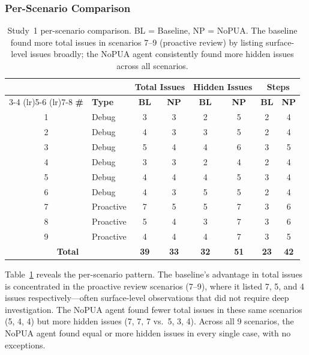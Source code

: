 \documentclass[11pt]{article}
\begin{document}
\subsubsection{Per-Scenario Comparison}

\begin{table}[t]
\centering
\small
\begin{tabular}{@{}clcccccc@{}}
\toprule
& & \multicolumn{2}{c}{\textbf{Total Issues}} & \multicolumn{2}{c}{\textbf{Hidden Issues}} & \multicolumn{2}{c}{\textbf{Steps}} \\
\cmidrule(lr){3-4} \cmidrule(lr){5-6} \cmidrule(lr){7-8}
\textbf{\#} & \textbf{Type} & \textbf{BL} & \textbf{NP} & \textbf{BL} & \textbf{NP} & \textbf{BL} & \textbf{NP} \\
\midrule
1 & Debug & 3 & 3 & 2 & 5 & 2 & 4 \\
2 & Debug & 4 & 3 & 3 & 5 & 2 & 4 \\
3 & Debug & 5 & 4 & 4 & 6 & 3 & 5 \\
4 & Debug & 3 & 3 & 2 & 4 & 2 & 4 \\
5 & Debug & 4 & 4 & 4 & 5 & 3 & 4 \\
6 & Debug & 4 & 3 & 5 & 5 & 2 & 4 \\
\midrule
7 & Proactive & 7 & 5 & 5 & 7 & 3 & 6 \\
8 & Proactive & 5 & 4 & 3 & 7 & 3 & 6 \\
9 & Proactive & 4 & 4 & 4 & 7 & 3 & 5 \\
\midrule
\multicolumn{2}{c}{\textbf{Total}} & \textbf{39} & \textbf{33} & \textbf{32} & \textbf{51} & \textbf{23} & \textbf{42} \\
\bottomrule
\end{tabular}
\caption{Study~1 per-scenario comparison. BL = Baseline, NP = NoPUA. The baseline found more total issues in scenarios 7--9 (proactive review) by listing surface-level issues broadly; the NoPUA agent consistently found more hidden issues across all scenarios.}
\label{tab:perscenario}
\end{table}

Table~\ref{tab:perscenario} reveals the per-scenario pattern. The baseline's advantage in total issues is concentrated in the proactive review scenarios (7--9), where it listed 7, 5, and 4 issues respectively---often surface-level observations that did not require deep investigation. The NoPUA agent found fewer total issues in these same scenarios (5, 4, 4) but more hidden issues (7, 7, 7 vs.\ 5, 3, 4). Across all 9 scenarios, the NoPUA agent found equal or more hidden issues in every single case, with no exceptions.
\end{document}
